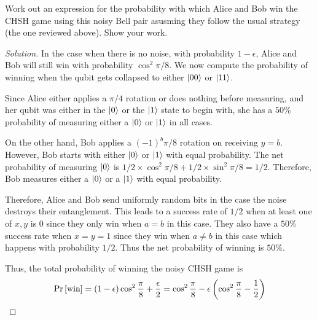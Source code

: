\begin{solution}[label=ques:4a]
  \begin{question}
    Work out an expression for the probability with which Alice and Bob win the CHSH game using this noisy Bell pair asusming they follow the usual strategy (the one reviewed above). Show your work.
  \end{question}
  \tcblower{}
  \begin{proof}[Solution]
    In the case when there is no noise, with probability $1 - \epsilon$, Alice and Bob will still win with probability $\cos^2\pi/8$. We now compute the probability of winning when the qubit gets collapsed to either $\ket{00}$ or $\ket{11}$.\par
    Since Alice either applies a $\pi/4$ rotation or does nothing before measuring, and her qubit was either in the $\ket{0}$ or the $\ket{1}$ state to begin with, she has a $50\%$ probability of measuring either a $\ket{0}$ or $\ket{1}$ in all cases.\par
    On the other hand, Bob applies a $(-1)^b\pi/8$ rotation on receiving $y = b$. However, Bob starts with either $\ket{0}$ or $\ket{1}$ with equal probability. The net probability of measuring $\ket{0}$ is $1/2\times \cos^2\pi/8 + 1/2\times\sin^2\pi/8 = 1/2$. Therefore, Bob measures either a $\ket{0}$ or a $\ket{1}$ with equal probability.\par
    Therefore, Alice and Bob send uniformly random bits in the case the noise destroys their entanglement. This leads to a success rate of $1/2$ when at least one of $x, y$ is $0$ since they only win when $a = b$ in this case. They also have a $50\%$ success rate when $x = y = 1$ since they win when $a \neq b$ in this case which happens with probability $1/2$. Thus the net probability of winning is $50\%$.\par
    Thus, the total probability of winning the noisy CHSH game is
    \begin{equation}
      \Pr\left[ \text{win} \right] = (1 - \epsilon)\cos^2\frac{\pi}{8} + \frac{\epsilon}{2} = \cos^2\frac{\pi}{8} - \epsilon\left(\cos^2\frac{\pi}{8} - \frac{1}{2}\right)
      \label{eq:noisywin}
    \end{equation}
  \end{proof}
\end{solution}

